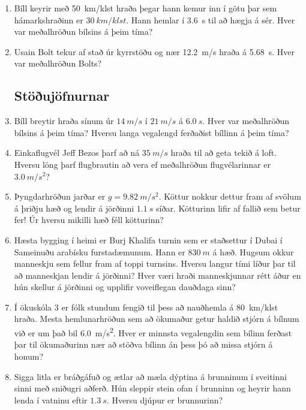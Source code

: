 \ifdefined \wholebook \else\documentclass[oneside]{book}\usepackage{EdlBook}\graphicspath{{figures/}}
\begin{document}
\begin{enumerate}[label = \textbf{Dæmi \thechapter.\arabic*.}]
\item Bíll keyrir með \SI{50}{km/klst} hraða  þegar hann kemur inn í götu þar sem hámarkshraðinn er $\SI{30}{km/klst}$. Hann hemlar í \SI{3.6}{s} til að hægja á sér. Hver var meðalhröðun bílsins á þeim tíma?

\item Usain Bolt tekur af stað úr kyrrstöðu og nær \SI{12.2}{m/s} hraða á \SI{5.68}{s}. Hver var meðalhröðun Bolts?

\subsection*{Stöðujöfnurnar}

\item Bíll breytir hraða sínum úr $\SI{14}{m/s}$ í $\SI{21}{m/s}$ á $\SI{6.0}{s}$. Hver var meðalhröðun bílsins á þeim tíma? Hversu langa vegalengd ferðaðist bíllinn á þeim tíma?

\item Einkaflugvél Jeff Bezos þarf að ná $\SI{35}{m/s}$ hraða til að geta tekið á loft. Hversu löng þarf flugbrautin að vera ef meðalhröðun flugvélarinnar er $\SI{3.0}{m/s^2}$?

\item Þyngdarhröðun jarðar er $g = \SI{9.82}{m/s^2}$. Köttur nokkur dettur fram af svölum á þriðju hæð og lendir á jörðinni $\SI{1.1}{s}$ síðar. Kötturinn lifir af fallið sem betur fer! Úr hversu mikilli hæð féll kötturinn?

\item Hæsta bygging í heimi er Burj Khalifa turnin sem er staðsettur í Dubai í Sameinuðu arabísku furstadæmunum. Hann er $\SI{830}{m}$ á hæð. Hugsum okkur manneskju sem fellur fram af toppi turnsins. Hversu langur tími líður þar til að manneskjan lendir á jörðinni? Hver væri hraði manneskjunnar rétt áður en hún skellur á jörðinni og upplifir voveiflegan dauðdaga sinn?

\item Í ökuskóla 3 er fólk stundum fengið til þess að nauðhemla á \SI{80}{km/klst} hraða.
Mesta hemlunarhröðun sem að ökumaður getur haldið stjórn á bílnum við er um það bil \SI{6.0}{m/s^2}. Hver er minnsta vegalengdin sem bílinn ferðast þar til ökumaðurinn nær að stöðva bílinn án þess þó að missa stjórn á honum?


\item Sigga litla er bráðgáfuð og ætlar að mæla dýptina á brunninum í sveitinni sinni með sniðugri aðferð. Hún sleppir stein ofan í brunninn og heyrir hann lenda í vatninu eftir $\SI{1.3}{s}$. Hversu djúpur er brunnurinn?



\end{enumerate}
\end{document}
